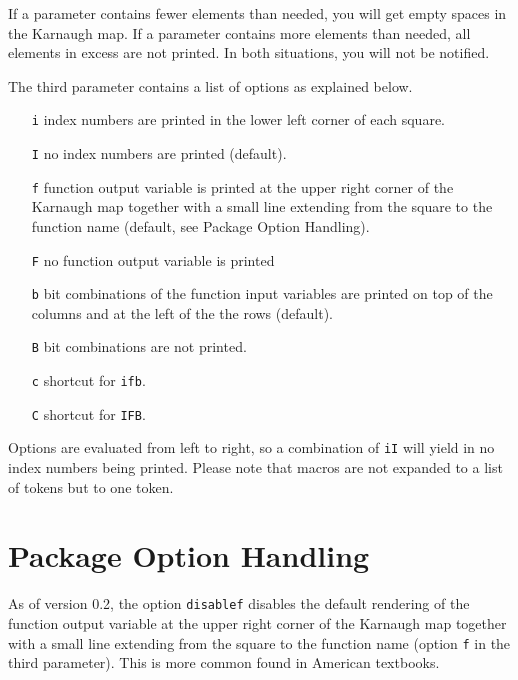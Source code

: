\documentclass[a4paper,10pt]{ltxdoc}
\begin{document}
If a parameter contains fewer elements than needed, you will get empty spaces
in the Karnaugh map. If a parameter contains more elements than needed, all
elements in excess are not printed. In both situations, you will not be
notified.

The third parameter contains a list of options as explained below.
\begin{itemize}
    \itemsep0pt
    \item[\texttt{i}] index numbers are printed in the lower left corner of
                      each square.
    \item[\texttt{I}] no index numbers are printed (default).
    \item[\texttt{f}] function output variable is printed at the upper right
                      corner of the Karnaugh map together with a small line
                      extending from the square to the function
                      name (default, see Package Option Handling).
    \item[\texttt{F}] no function output variable is printed
    \item[\texttt{b}] bit combinations of the function input variables are
                      printed on top of the columns and at the left of the the
                      rows (default).
    \item[\texttt{B}] bit combinations are not printed.
    \item[\texttt{c}] shortcut for \texttt{ifb}.
    \item[\texttt{C}] shortcut for \texttt{IFB}.
\end{itemize}

Options are evaluated from left to right, so a combination of \texttt{iI} will
yield in no index numbers being printed. Please note that macros are not
expanded to a list of tokens but to one token.


\section{Package Option Handling}
\label{sec:optionhandling}
As of version 0.2, the option \texttt{disablef} disables the default rendering
of the function output variable at the upper right corner of the Karnaugh map
together with a small line extending from the square to the function name
(option \texttt{f} in the third parameter). This is more common found in
American textbooks.
\end{document}
